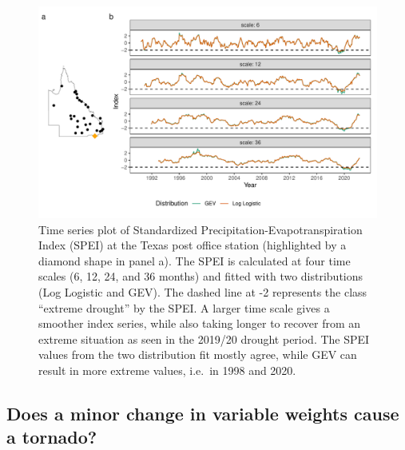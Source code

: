 \documentclass[
]{interact}
\begin{document}
\begin{figure}

{\centering \includegraphics{tidyindex_files/figure-pdf/fig-compute-temporal-1.pdf}

}

\caption{\label{fig-compute-temporal}Time series plot of Standardized
Precipitation-Evapotranspiration Index (SPEI) at the Texas post office
station (highlighted by a diamond shape in panel a). The SPEI is
calculated at four time scales (6, 12, 24, and 36 months) and fitted
with two distributions (Log Logistic and GEV). The dashed line at -2
represents the class ``extreme drought'' by the SPEI. A larger time
scale gives a smoother index series, while also taking longer to recover
from an extreme situation as seen in the 2019/20 drought period. The
SPEI values from the two distribution fit mostly agree, while GEV can
result in more extreme values, i.e.~in 1998 and 2020.}

\end{figure}

\hypertarget{does-a-minor-change-in-variable-weights-cause-a-tornado}{%
\subsection{Does a minor change in variable weights cause a
tornado?}\label{does-a-minor-change-in-variable-weights-cause-a-tornado}}
\end{document}
